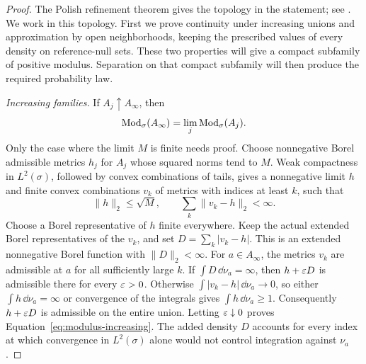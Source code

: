 \begin{proof}
The Polish refinement theorem gives the topology in the statement; see
\cite[Section~13.A, in particular Exercise~13.5]{Kechris1995}.  We work in this topology.  First we prove continuity
under increasing unions and approximation by open neighborhoods, keeping
the prescribed values of every density on reference-null sets.  These two
properties will give a compact subfamily of positive modulus.  Separation
on that compact subfamily will then produce the required probability law.

\smallskip\noindent
\emph{Increasing families.}
If \(A_j\uparrow A_\infty\), then
\begin{equation}\label{eq:modulus-increasing}
 \operatorname{Mod}_\sigma(A_\infty)=\lim_j\operatorname{Mod}_\sigma(A_j).
\end{equation}
Only the case where the limit \(M\) is finite needs proof.  Choose
nonnegative Borel admissible metrics \(h_j\) for \(A_j\) whose squared
norms tend to \(M\).  Weak compactness in \(L^2(\sigma)\), followed by
convex combinations of tails, gives a nonnegative limit \(h\) and finite
convex combinations \(v_k\) of metrics with indices at least \(k\), such
that
\[
 \|h\|_2\le\sqrt M,
 \qquad \sum_k\|v_k-h\|_2<\infty.
\]
Choose a Borel representative of \(h\) finite everywhere.  Keep the actual
extended Borel representatives of the \(v_k\), and set
\(D=\sum_k|v_k-h|\).  This is an extended nonnegative Borel function with
\(\|D\|_2<\infty\).  For \(a\in A_\infty\), the metrics \(v_k\) are
admissible at \(a\) for all sufficiently large \(k\).  If
\(\int D\,\dd\nu_a=\infty\), then \(h+\varepsilon D\) is admissible there for
every \(\varepsilon>0\).  Otherwise
\(\int|v_k-h|\,\dd\nu_a\to0\), so either \(\int h\,\dd\nu_a=\infty\)
or convergence of the integrals gives \(\int h\,\dd\nu_a\ge1\).
Consequently \(h+\varepsilon D\) is admissible on the entire union.  Letting
\(\varepsilon\downarrow0\) proves Equation~\eqref{eq:modulus-increasing}.
The added density $D$ accounts for every index at which convergence in
$L^2(\sigma)$ alone would not control integration against $\nu_a$.


\end{proof}
